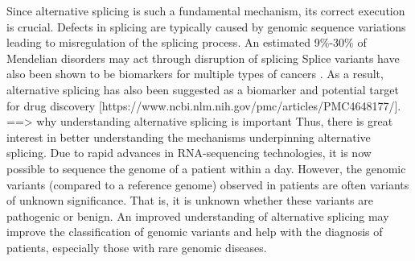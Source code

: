 Since alternative splicing is such a fundamental mechanism, its correct execution is crucial. Defects in splicing are typically caused by genomic sequence variations leading to misregulation of the splicing process. An estimated 9\%-30\% of Mendelian disorders may act through disruption of splicing \cite{comparison}
Splice variants have also been shown to be biomarkers for multiple types of cancers \cite{cancer}. As a result, alternative splicing has also been suggested as a biomarker and potential target for drug discovery [https://www.ncbi.nlm.nih.gov/pmc/articles/PMC4648177/]. \\
==> why understanding alternative splicing is important
Thus, there is great interest in better understanding the mechanisms underpinning alternative splicing. Due to rapid advances in RNA-sequencing technologies, it is now possible to sequence the genome of a patient within a day. However, the genomic variants (compared to a reference genome) observed in patients are often variants of unknown significance. \cite{bretschneiderphdthesis} That is, it is unknown whether these variants are pathogenic or benign. An improved understanding of alternative splicing may improve the classification of genomic variants and help with the diagnosis of patients, especially those with rare genomic diseases.
